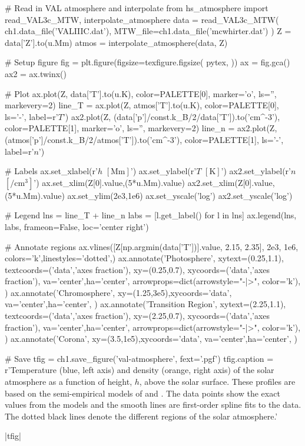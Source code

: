 \begin{pycode}[chapter1]
# Read in VAL atmosphere and interpolate
from hs_atmosphere import read_VAL3c_MTW, interpolate_atmosphere
data = read_VAL3c_MTW(
    ch1.data_file('VALIIIC.dat'),
    MTW_file=ch1.data_file('mcwhirter.dat')
)
Z = data['Z'].to(u.Mm)
atmos = interpolate_atmosphere(data, Z)

# Setup figure
fig = plt.figure(figsize=texfigure.figsize(
    pytex,
))
ax = fig.gca()
ax2 = ax.twinx()

# Plot
ax.plot(Z, data['T'].to(u.K), color=PALETTE[0], marker='o', ls='', markevery=2)
line_T = ax.plot(Z, atmos['T'].to(u.K), color=PALETTE[0], ls='-', label=r'$T$')
ax2.plot(Z, (data['p']/const.k_B/2/data['T']).to('cm^-3'),
            color=PALETTE[1], marker='o', ls='', markevery=2)
line_n = ax2.plot(Z, (atmos['p']/const.k_B/2/atmos['T']).to('cm^-3'),
                    color=PALETTE[1], ls='-', label=r'$n$')

# Labels
ax.set_xlabel(r'$h$ $[\si{\mega\m}]$')
ax.set_ylabel(r'$T$ $[\si{\kelvin}]$')
ax2.set_ylabel(r'$n$ $[\si{\per\cubic\cm}]$')
ax.set_xlim(Z[0].value,(5*u.Mm).value)
ax2.set_xlim(Z[0].value,(5*u.Mm).value)
ax.set_ylim(2e3,1e6)
ax.set_yscale('log')
ax2.set_yscale('log')

# Legend
lns = line_T + line_n
labs = [l.get_label() for l in lns]
ax.legend(lns, labs, frameon=False, loc='center right')

# Annotate regions
ax.vlines([Z[np.argmin(data['T'])].value, 2.15, 2.35], 2e3, 1e6,
            colors='k',linestyles='dotted',)
ax.annotate('Photosphere',
            xytext=(0.25,1.1), textcoords=('data','axes fraction'),
            xy=(0.25,0.7), xycoords=('data','axes fraction'),
            va='center',ha='center',
            arrowprops=dict(arrowstyle="-|>", color='k'),
)
ax.annotate('Chromosphere',
            xy=(1.25,3e5),xycoords='data',
            va='center',ha='center',
)
ax.annotate('Transition Region',
            xytext=(2.25,1.1), textcoords=('data','axes fraction'),
            xy=(2.25,0.7), xycoords=('data','axes fraction'),
            va='center',ha='center',
            arrowprops=dict(arrowstyle="-|>", color='k'),
)
ax.annotate('Corona',
            xy=(3.5,1e5),xycoords='data',
            va='center',ha='center',
)

# Save
tfig = ch1.save_figure('val-atmosphere', fext='.pgf')
tfig.caption = r'Temperature (blue, left axis) and density (orange, right axis) of the solar atmosphere as a function of height, $h$, above the solar surface. These profiles are based on the semi-empirical models of \citet{mcwhirter_heating_1975} and \citet{vernazza_structure_1981}. The data points show the exact values from the models and the smooth lines are first-order spline fits to the data. The dotted black lines denote the different regions of the solar atmosphere.'
\end{pycode}
\py[chapter1]|tfig|

